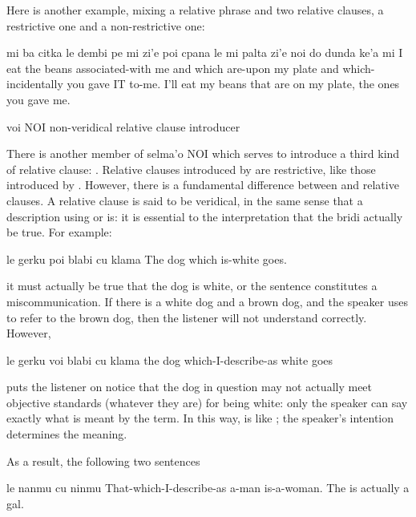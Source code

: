 Here is another example, mixing a relative phrase and two
    relative clauses, a restrictive one and a non-restrictive
    one:
\begin{example}
mi ba citka le dembi pe mi\n
\T	zi'e poi cpana le mi palta\n
\T	zi'e noi do dunda ke'a mi\n
I  eat the beans associated-with me\n
\T	and which are-upon my plate\n
\T	and which-incidentally you gave IT to-me.\n
I'll eat my beans that are on my plate, the ones\n
\T	you gave me.
\end{example}




   voi NOI non-veridical relative clause introducer

There is another member of selma'o NOI which serves to
    introduce a third kind of relative clause: . Relative
    clauses introduced by  are restrictive, like those
    introduced by . However, there is a fundamental
    difference between  and  relative clauses. A
     relative clause is said to be veridical, in the same
    sense that a description using  or  is: it is
    essential to the interpretation that the bridi actually be
    true. For example:
\begin{example}
le gerku poi blabi cu klama\n
The dog which is-white goes.
\end{example}

{\noindent}it must actually be true that the dog is white, or the sentence
    constitutes a miscommunication. If there is a white dog and a
    brown dog, and the speaker uses  to refer
    to the brown dog, then the listener will not understand
    correctly. However,
\begin{example}
le gerku voi blabi cu klama\n
the dog which-I-describe-as white goes
\end{example}

{\noindent}puts the listener on notice that the dog in question may not
    actually meet objective standards (whatever they are) for being
    white: only the speaker can say exactly what is meant by the
    term. In this way,  is like ; the speaker's
    intention determines the meaning. 

As a result, the following two sentences
\begin{example}
le nanmu cu ninmu\n
That-which-I-describe-as a-man is-a-woman.\n
The  is actually a gal.
\end{example}

